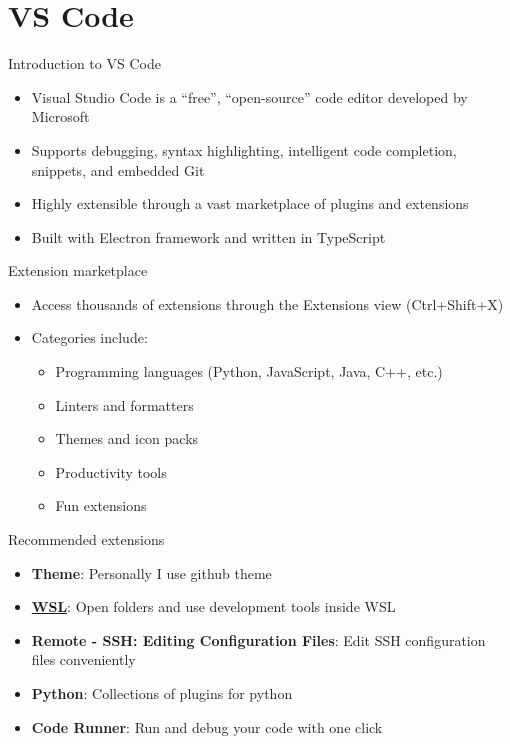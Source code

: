 \section{VS Code}

\begin{frame}[fragile]{Introduction to VS Code}
	\begin{itemize}
		\item Visual Studio Code is a ``free'', ``open-source'' code editor developed by Microsoft
		\item Supports debugging, syntax highlighting, intelligent code completion, snippets, and embedded Git
		\item Highly extensible through a vast marketplace of plugins and extensions
		\item Built with Electron framework and written in TypeScript
	\end{itemize}
\end{frame}

\begin{frame}[fragile]{Extension marketplace}
	\begin{itemize}
		\item Access thousands of extensions through the Extensions view (Ctrl+Shift+X)
		\item Categories include:
		\begin{itemize}
			\item Programming languages (Python, JavaScript, Java, C++, etc.)
			\item Linters and formatters
			\item Themes and icon packs
			\item Productivity tools
			\item Fun extensions
		\end{itemize}
	\end{itemize}
\end{frame}

\begin{frame}[fragile]{Recommended extensions}
	\begin{itemize}
		\item \textbf{Theme}: Personally I use github theme
		\item \textbf{\href{https://code.visualstudio.com/docs/remote/wsl}{WSL}}: Open folders and use development tools inside WSL
		\item \textbf{Remote - SSH: Editing Configuration Files}: Edit SSH configuration files conveniently
		\item \textbf{Python}: Collections of plugins for python
		\item \textbf{Code Runner}: Run and debug your code with one click
	\end{itemize}
\end{frame}

